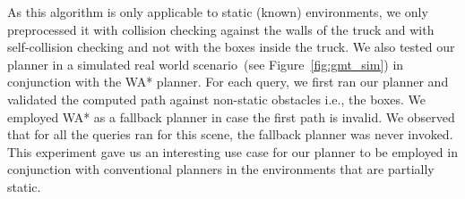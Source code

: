 \documentclass[a4paper]{report}
\begin{document}
\begin{table}[ht]
\centering
     \resizebox{0.7\columnwidth}{!}{%
        \begin{tabular}{ l | c c c c}  
           & arm & nose & arm+base & nose+base\\
         \hline
         WA* 		& 12.8 & 7.2 & 7.5 & 4.4 \\
         Our Method & 0.69 & 0.29 & 0.5 & 0.47 \\
        \end{tabular}
    }
    \caption{Comparison of mean planning times~[ms] averaged over 100 randomized queries for different modes of operation of the truck-unloading robot. The number of subregions preprocessed for each of these modes~(left to right) are~101,~7,~85 and~308.}
    \label{tab:gmt}
\end{table}

As this algorithm is only applicable to static (known) environments, we only preprocessed it with collision checking against the walls of the truck and with self-collision checking and not with the boxes inside the truck. We also tested our planner in a simulated real world scenario~(see Figure~\ref{fig:gmt_sim}) in conjunction with the WA* planner. For each query, we first ran our planner and validated the computed path against non-static obstacles i.e., the boxes. We employed WA* as a fallback planner in case the first path is invalid. We observed that for all the queries ran for this scene, the fallback planner was never invoked. This experiment gave us an interesting use case for our planner to be employed in conjunction with conventional planners in the environments that are partially static.
\end{document}
